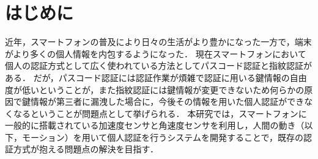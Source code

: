 \section{はじめに}
近年，スマートフォンの普及により日々の生活がより豊かになった一方で，端末がより多くの個人情報を内包するようになった．
現在スマートフォンにおいて個人の認証方式として広く使われている方法としてパスコード認証と指紋認証がある．
だが，パスコード認証には認証作業が煩雑で認証に用いる鍵情報の自由度が低いということが，また指紋認証には鍵情報が変更できないため何らかの原因で鍵情報が第三者に漏洩した場合に，今後その情報を用いた個人認証ができなくなるということが問題点として挙げられる．
本研究では，スマートフォンに一般的に搭載されている加速度センサと角速度センサを利用し，人間の動き（以下，モーション）を用いて個人認証を行うシステムを開発することで，既存の認証方式が抱える問題点の解決を目指す．
